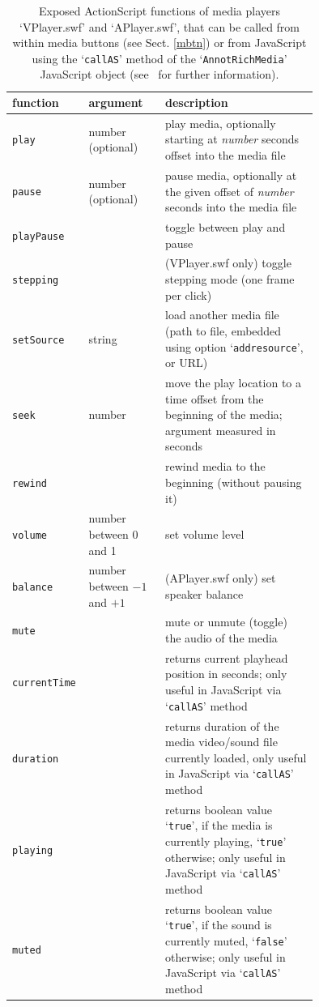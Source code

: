 \documentclass[a4paper]{article}
\begin{document}
\begin{table}[bp]
\centering
\caption{Exposed ActionScript functions of media players `VPlayer.swf' and `APlayer.swf', that can be called from within media buttons (see Sect. \ref{mbtn}) or from JavaScript using the `{\tt callAS}' method of the `{\tt AnnotRichMedia}' JavaScript object (see~\cite{jscript} for further information).}\label{AVPlayerMethods}
\begin{tabular}[t]{lp{0.25\linewidth}p{0.5\linewidth}}\hline
function & argument &description\\\hline\hline
{\tt play}       & number (optional)      & play media, optionally starting at \emph{number} seconds offset into the media file\\
{\tt pause}      & number (optional)      & pause media, optionally at the given offset of \emph{number} seconds into the media file\\
{\tt playPause}  &                        & toggle between play and pause\\
{\tt stepping}   &                        & (VPlayer.swf only) toggle stepping mode (one frame per click)\\
{\tt setSource}  & string                 & load another media file (path to file, embedded using option `{\tt addresource}', or URL)\\
{\tt seek}       & number                 & move the play location to a time offset from the beginning of the media; argument measured in seconds\\
{\tt rewind}     &                        & rewind media to the beginning (without pausing it)\\
{\tt volume}     & number between 0 and 1 & set volume level\\
{\tt balance}    & number between $-1$ and $+1$ & (APlayer.swf only) set speaker balance\\
{\tt mute}       &                        & mute or unmute (toggle) the audio of the media\\
{\tt currentTime}&                        & returns current playhead position in seconds; only useful in JavaScript via `{\tt callAS}' method\\
{\tt duration}   &                        & returns duration of the media video/sound file currently loaded, only useful in JavaScript via `{\tt callAS}' method\\
{\tt playing}    &                        & returns boolean value `{\tt true}', if the media is currently playing, `{\tt true}' otherwise; only useful in JavaScript via `{\tt callAS}' method\\
{\tt muted}      &                        & returns boolean value `{\tt true}', if the sound is currently muted, `{\tt false}' otherwise; only useful in JavaScript via `{\tt callAS}' method\\\hline
\end{tabular}
\end{table}
\end{document}
